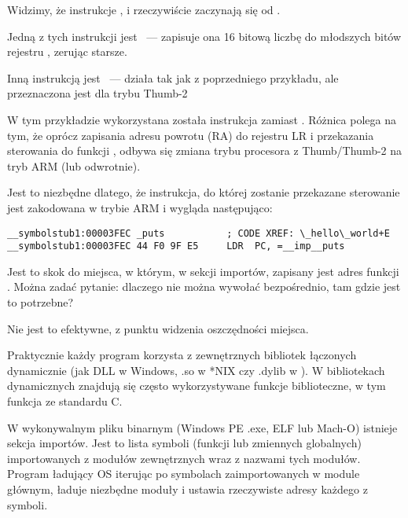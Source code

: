 Widzimy, że instrukcje ,  i  rzeczywiście zaczynają się od .

Jedną z tych instrukcji jest
~--- zapisuje ona 16 bitową liczbę do młodszych bitów rejestru , zerując starsze.

Inną instrukcją jest ~---  działa tak jak  z poprzedniego przykładu, ale przeznaczona jest dla trybu Thumb-2

W tym przykładzie wykorzystana została instrukcja  zamiast .
Różnica polega na tym, że oprócz zapisania adresu powrotu (\ac{RA}) do rejestru \ac{LR} i przekazania sterowania
do funkcji \puts, odbywa się zmiana trybu procesora z Thumb/Thumb-2 na tryb ARM (lub odwrotnie).

Jest to niezbędne dlatego, że instrukcja, do której zostanie przekazane sterowanie jest zakodowana w trybie ARM i wygląda następująco:

\begin{lstlisting}[style=customasmARM]
__symbolstub1:00003FEC _puts           ; CODE XREF: \_hello\_world+E
__symbolstub1:00003FEC 44 F0 9F E5     LDR  PC, =__imp__puts
\end{lstlisting}

Jest to skok do miejsca, w którym, w sekcji importów, zapisany jest adres funkcji \puts.
Można zadać pytanie: dlaczego nie można wywołać \puts bezpośrednio, tam gdzie jest to potrzebne?

Nie jest to efektywne, z punktu widzenia oszczędności miejsca.

Praktycznie każdy program korzysta z zewnętrznych bibliotek łączonych dynamicznie (jak DLL w Windows, .so w *NIX
czy .dylib w \MacOSX).
W bibliotekach dynamicznych znajdują się często wykorzystywane funkcje biblioteczne, w tym funkcja \puts ze standardu C.

W wykonywalnym pliku binarnym (Windows PE .exe, ELF lub Mach-O) istnieje sekcja importów.
Jest to lista symboli (funkcji lub zmiennych globalnych) importowanych z modułów zewnętrznych wraz z nazwami tych modułów.
Program ładujący \ac{OS} iterując po symbolach zaimportowanych w module głównym, ładuje niezbędne moduły i ustawia rzeczywiste adresy każdego z symboli.

